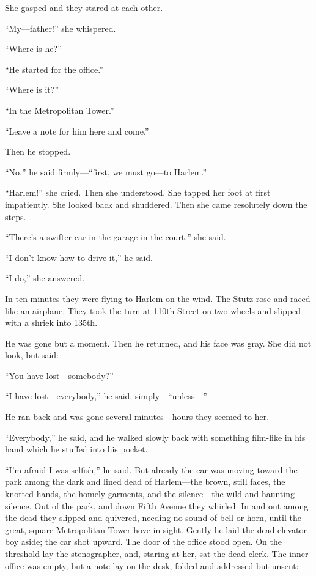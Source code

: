 She gasped and they stared at each other.

``My---father!'' she whispered.

``Where is he?''

``He started for the office.''

``Where is it?''

``In the Metropolitan Tower.''

``Leave a note for him here and come.''

Then he stopped.

``No,'' he said firmly---``first, we must go---to Harlem.''

``Harlem!'' she cried. Then she understood. She tapped her foot at
first impatiently. She looked back and shuddered. Then she came
resolutely down the steps.

``There's a swifter car in the garage in the court,'' she said.

``I don't know how to drive it,'' he said.

``I do,'' she answered.

In ten minutes they were flying to Harlem on the wind. The Stutz
rose and raced like an airplane. They took the turn at 110th
Street on two wheels and slipped with a shriek into 135th.

He was gone but a moment. Then he returned, and his face was
gray. She did not look, but said:

``You have lost---somebody?''

``I have lost---everybody,'' he said, simply---``unless---''

He ran back and was gone several minutes---hours they seemed to
her.

``Everybody,'' he said, and he walked slowly back with something
film-like in his hand which he stuffed into his pocket.

``I'm afraid I was selfish,'' he said. But already the car was
moving toward the park among the dark and lined dead of
Harlem---the brown, still faces, the knotted hands, the homely
garments, and the silence---the wild and haunting silence. Out of
the park, and down Fifth Avenue they whirled. In and out among
the dead they slipped and quivered, needing no sound of bell or
horn, until the great, square Metropolitan Tower hove in sight.
Gently he laid the dead elevator boy aside; the car shot upward.
The door of the office stood open. On the threshold lay the
stenographer, and, staring at her, sat the dead clerk. The inner
office was empty, but a note lay on the desk, folded and
addressed but unsent:

